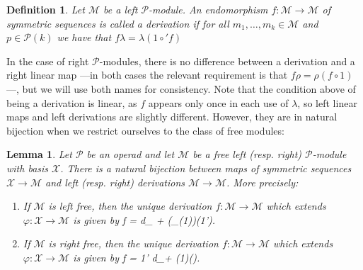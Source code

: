 \documentclass[fleqn, a4paper, twoside]{article}
\makeatletter
\newcommand{\0}{\langle 0\rangle}
\newcommand{\XX}{\mathcal{X}}
\newenvironment{tenumerate}{
 \begin{enumerate}
  \setlength{\itemsep}{0pt}
  \setlength{\parskip}{0pt}
}{\end{enumerate}}
\let\[\@undefined
\DeclareRobustCommand{\[}{\begin{equation}}%
\let\]\@undefined
\DeclareRobustCommand{\]}{\end{equation}}%
\theoremstyle{mytheorem}
\newtheorem{lemma}[theorem]{Lemma}
\theoremstyle{introthm}
\theoremstyle{mydefinition}
\newtheorem{definition}[theorem]{Definition}
\theoremstyle{mydefinition2}
\theoremstyle{plain} %
\newcommand{\?}{\,?\,}
\newcommand{\PP}{{\mathcal{P}}}
\newcommand{\MM}{\mathcal M}
\theoremstyle{mytheorem}
\theoremstyle{plain} %
\makeatother
\begin{document}
\begin{definition}
Let $\MM$ be a left $\PP$-module. An endomorphism
$f: \MM \longrightarrow \MM$ of symmetric sequences is
called a derivation if for all $m_1,\ldots,m_k\in\MM$
and $p\in\PP(k)$ we have that $f \lambda = \lambda(1\circ' f)$
\end{definition}
 
In the case of right $\PP$-modules, there is no difference
between a derivation and a right linear map ---in both cases
the relevant requirement is that $f\rho = \rho(f\circ 1)$---, but we will use
both names for consistency. Note that the condition above of
being a derivation is linear, as $f$ appears only once in each
use of $\lambda$, so left linear maps and left derivations
are slightly different. However, they are in natural bijection
when we restrict ourselves to the class of free modules:

\begin{lemma}\label{lemma:derivations}
Let $\PP$ be an operad and let $\MM$ be a free
left (resp. right) $\PP$-module with basis $\XX$.
There is a natural bijection between maps of 
symmetric sequences $\XX\longrightarrow \MM$
and left (resp. right) derivations $\MM\longrightarrow \MM$.
More precisely:
\begin{tenumerate}
\item If $\MM$ is left free, then the unique derivation $f:\MM\longrightarrow\MM$
which extends $\varphi: \XX\longrightarrow \MM$ is given by
\[
f = d_\PP {} + (\gamma_{(1)})(1\circ'\varphi).
\]
\item  If $\MM$ is right free, then the unique derivation $f:\MM\longrightarrow\MM$ 
which extends $\varphi: \XX\longrightarrow \MM$ is given by
\[
f = 1\circ' d_\PP  + (1\circ\gamma)(\varphi{}).
\]
\end{tenumerate}
\end{lemma}
\end{document}
